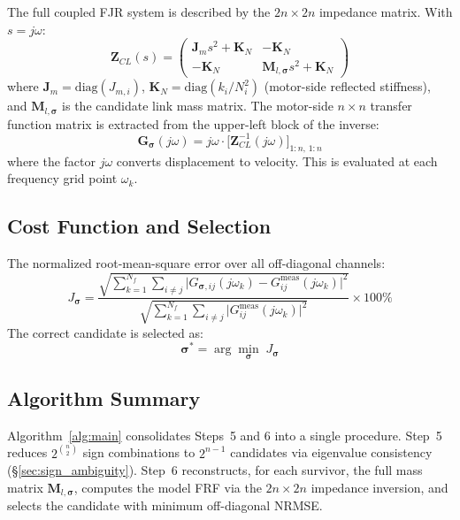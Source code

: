 \documentclass[10pt,twocolumn]{article}
\newcommand{\diag}{\mathrm{diag}}
\begin{document}
The full coupled FJR system is described by the $2n \times 2n$ impedance matrix. With $s = j\omega$:
\begin{equation}
\bm{Z}_{CL}(s) = \begin{pmatrix}
\bm{J}_m s^2 + \bm{K}_N & -\bm{K}_N \\
-\bm{K}_N & \bm{M}_{l,\bm{\sigma}} s^2 + \bm{K}_N
\end{pmatrix}
\label{eq:Zcl}
\end{equation}
where $\bm{J}_m = \diag(J_{m,i})$, $\bm{K}_N = \diag(k_i/N_i^2)$ (motor-side reflected stiffness), and $\bm{M}_{l,\bm{\sigma}}$ is the candidate link mass matrix. The motor-side $n \times n$ transfer function matrix is extracted from the upper-left block of the inverse:
\begin{equation}
\bm{G}_{\bm{\sigma}}(j\omega) = j\omega \cdot \bigl[\bm{Z}_{CL}^{-1}(j\omega)\bigr]_{1:n,\,1:n}
\label{eq:model_frf}
\end{equation}
where the factor $j\omega$ converts displacement to velocity. This is evaluated at each frequency grid point $\omega_k$.

\subsection{Cost Function and Selection}

The normalized root-mean-square error over all off-diagonal channels:
\begin{equation}
J_{\bm{\sigma}} = \frac{\displaystyle\sqrt{\sum_{k=1}^{N_f}\sum_{i \neq j} \bigl|G_{\bm{\sigma},ij}(j\omega_k) - G_{ij}^{\mathrm{meas}}(j\omega_k)\bigr|^2}}{\displaystyle\sqrt{\sum_{k=1}^{N_f}\sum_{i \neq j} \bigl|G_{ij}^{\mathrm{meas}}(j\omega_k)\bigr|^2}} \times 100\%
\label{eq:nrmse}
\end{equation}
The correct candidate is selected as:
\begin{equation}
\bm{\sigma}^* = \arg\min_{\bm{\sigma}} \; J_{\bm{\sigma}}
\label{eq:sigma_star}
\end{equation}

\subsection{Algorithm Summary}

Algorithm~\ref{alg:main} consolidates Steps~5 and 6 into a single procedure. Step~5 reduces $2^{\binom{n}{2}}$ sign combinations to $2^{n-1}$ candidates via eigenvalue consistency (\S\ref{sec:sign_ambiguity}). Step~6 reconstructs, for each survivor, the full mass matrix $\bm{M}_{l,\bm{\sigma}}$, computes the model FRF via the $2n \times 2n$ impedance inversion, and selects the candidate with minimum off-diagonal NRMSE.
\end{document}
